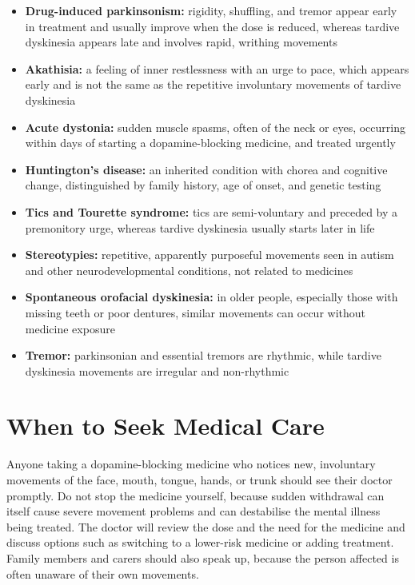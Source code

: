 \begin{itemize}
    \item \textbf{Drug-induced parkinsonism:} rigidity, shuffling, and tremor appear early in treatment and usually improve when the dose is reduced, whereas tardive dyskinesia appears late and involves rapid, writhing movements
    \item \textbf{Akathisia:} a feeling of inner restlessness with an urge to pace, which appears early and is not the same as the repetitive involuntary movements of tardive dyskinesia
    \item \textbf{Acute dystonia:} sudden muscle spasms, often of the neck or eyes, occurring within days of starting a dopamine-blocking medicine, and treated urgently
    \item \textbf{Huntington's disease:} an inherited condition with chorea and cognitive change, distinguished by family history, age of onset, and genetic testing
    \item \textbf{Tics and Tourette syndrome:} tics are semi-voluntary and preceded by a premonitory urge, whereas tardive dyskinesia usually starts later in life
    \item \textbf{Stereotypies:} repetitive, apparently purposeful movements seen in autism and other neurodevelopmental conditions, not related to medicines
    \item \textbf{Spontaneous orofacial dyskinesia:} in older people, especially those with missing teeth or poor dentures, similar movements can occur without medicine exposure
    \item \textbf{Tremor:} parkinsonian and essential tremors are rhythmic, while tardive dyskinesia movements are irregular and non-rhythmic
\end{itemize}

\section*{When to Seek Medical Care}
Anyone taking a dopamine-blocking medicine who notices new, involuntary movements of the face, mouth, tongue, hands, or trunk should see their doctor promptly. Do not stop the medicine yourself, because sudden withdrawal can itself cause severe movement problems and can destabilise the mental illness being treated. The doctor will review the dose and the need for the medicine and discuss options such as switching to a lower-risk medicine or adding treatment. Family members and carers should also speak up, because the person affected is often unaware of their own movements.

